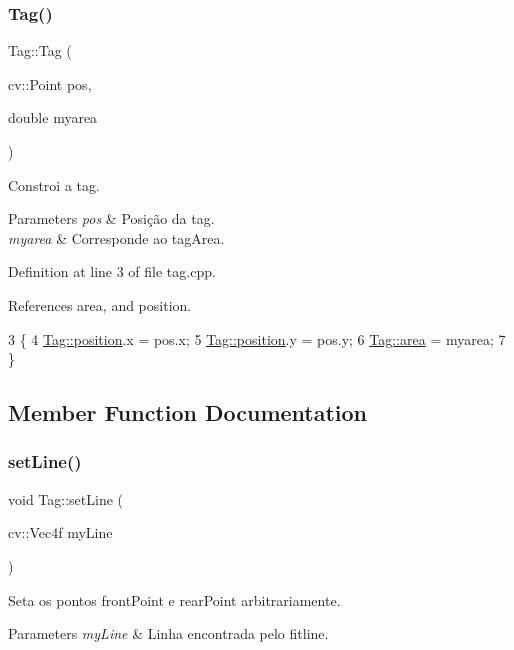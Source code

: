 \subsubsection{\texorpdfstring{Tag()}{Tag()}}
{\footnotesize\ttfamily Tag\+::\+Tag (\begin{DoxyParamCaption}\item[{cv\+::\+Point}]{pos,  }\item[{double}]{myarea }\end{DoxyParamCaption})}

Constroi a tag. 
\begin{DoxyParams}{Parameters}
{\em pos} & Posição da tag. \\
\hline
{\em myarea} & Corresponde ao tag\+Area. \\
\hline
\end{DoxyParams}


Definition at line 3 of file tag.\+cpp.



References area, and position.


\begin{DoxyCode}
3                                    \{
4     \hyperlink{class_tag_a254916f52244a8ff7d559eff681450a1}{Tag::position}.x = pos.x;
5     \hyperlink{class_tag_a254916f52244a8ff7d559eff681450a1}{Tag::position}.y = pos.y;
6     \hyperlink{class_tag_a0e977e5b9c03ed1280eb9aeedd3c9dbc}{Tag::area} = myarea;
7 \}
\end{DoxyCode}


\subsection{Member Function Documentation}
\mbox{\label{class_tag_a879d13a2559bfc88c965a403ca7f6428}} 
\subsubsection{\texorpdfstring{set\+Line()}{setLine()}}
{\footnotesize\ttfamily void Tag\+::set\+Line (\begin{DoxyParamCaption}\item[{cv\+::\+Vec4f}]{my\+Line }\end{DoxyParamCaption})}

Seta os pontos front\+Point e rear\+Point arbitrariamente. 
\begin{DoxyParams}{Parameters}
{\em my\+Line} & Linha encontrada pelo fitline. \\
\hline
\end{DoxyParams}


